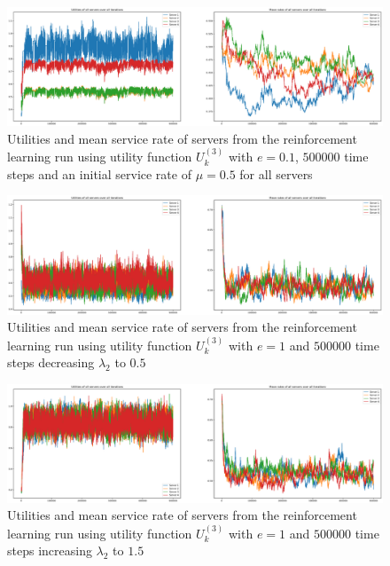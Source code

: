 \begin{figure}[H]
    \includegraphics[width=\textwidth]{chapters/00_appendix/03_more_rl_results/Bin/utility_3_eps/u3_3_initial_05.eps}
    \caption{Utilities and mean service rate of servers from the reinforcement
    learning run using utility function \(U_k^{(3)}\) with \(e = 0.1\),
    \(500000\) time steps and an initial service rate of \(\mu = 0.5\) for all
    servers}
    \label{fig:RL_utility3_3_initial_05}
\end{figure}

\begin{figure}[H]
    \includegraphics[width=\textwidth]{chapters/00_appendix/03_more_rl_results/Bin/utility_3_eps/u3_4_lambda2_05.eps}
    \caption{Utilities and mean service rate of servers from the reinforcement
    learning run using utility function \(U_k^{(3)}\) with \(e = 1\) and
    \(500000\) time steps decreasing \(\lambda_2\) to \(0.5\)}
    \label{fig:RL_utility3_4_lambda2_05}
\end{figure}

\begin{figure}[H]
    \includegraphics[width=\textwidth]{chapters/00_appendix/03_more_rl_results/Bin/utility_3_eps/u3_4_lambda2_15.eps}
    \caption{Utilities and mean service rate of servers from the reinforcement
    learning run using utility function \(U_k^{(3)}\) with \(e = 1\) and
    \(500000\) time steps increasing \(\lambda_2\) to \(1.5\)}
    \label{fig:RL_utility3_4_lambda2_15}
\end{figure}

